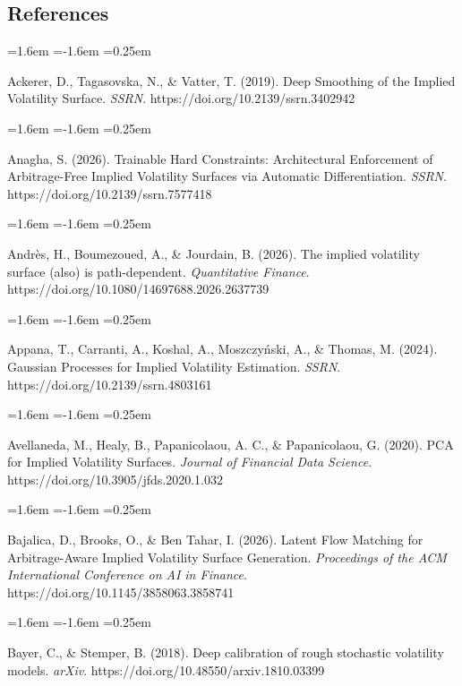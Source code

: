 \documentclass[11pt]{article}
\begin{document}
\subsection*{References}
\begin{list}{}{\leftmargin=1.6em \itemindent=-1.6em \itemsep=0.25em}
\item Ackerer, D., Tagasovska, N., \& Vatter, T. (2019). Deep Smoothing of the Implied Volatility Surface. \textit{SSRN}. https://doi.org/10.2139/ssrn.3402942
\end{list}
\begin{list}{}{\leftmargin=1.6em \itemindent=-1.6em \itemsep=0.25em}
\item Anagha, S. (2026). Trainable Hard Constraints: Architectural Enforcement of Arbitrage-Free Implied Volatility Surfaces via Automatic Differentiation. \textit{SSRN}. https://doi.org/10.2139/ssrn.7577418
\end{list}
\begin{list}{}{\leftmargin=1.6em \itemindent=-1.6em \itemsep=0.25em}
\item Andrès, H., Boumezoued, A., \& Jourdain, B. (2026). The implied volatility surface (also) is path-dependent. \textit{Quantitative Finance}. https://doi.org/10.1080/14697688.2026.2637739
\end{list}
\begin{list}{}{\leftmargin=1.6em \itemindent=-1.6em \itemsep=0.25em}
\item Appana, T., Carranti, A., Koshal, A., Moszczyński, A., \& Thomas, M. (2024). Gaussian Processes for Implied Volatility Estimation. \textit{SSRN}. https://doi.org/10.2139/ssrn.4803161
\end{list}
\begin{list}{}{\leftmargin=1.6em \itemindent=-1.6em \itemsep=0.25em}
\item Avellaneda, M., Healy, B., Papanicolaou, A. C., \& Papanicolaou, G. (2020). PCA for Implied Volatility Surfaces. \textit{Journal of Financial Data Science}. https://doi.org/10.3905/jfds.2020.1.032
\end{list}
\begin{list}{}{\leftmargin=1.6em \itemindent=-1.6em \itemsep=0.25em}
\item Bajalica, D., Brooks, O., \& Ben Tahar, I. (2026). Latent Flow Matching for Arbitrage-Aware Implied Volatility Surface Generation. \textit{Proceedings of the ACM International Conference on AI in Finance}. https://doi.org/10.1145/3858063.3858741
\end{list}
\begin{list}{}{\leftmargin=1.6em \itemindent=-1.6em \itemsep=0.25em}
\item Bayer, C., \& Stemper, B. (2018). Deep calibration of rough stochastic volatility models. \textit{arXiv}. https://doi.org/10.48550/arxiv.1810.03399
\end{list}
\end{document}
